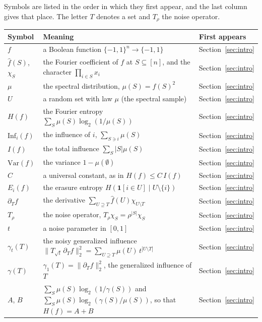 \documentclass[11pt]{amsart}
\theoremstyle{remark}
\newcommand{\Inf}{\mathrm{Inf}}
\newcommand{\Var}{\mathrm{Var}}
\begin{document}
Symbols are listed in the order in which they first appear, and the last column gives that place. The letter $T$
denotes a set and $T_\rho$ the noise operator.

\begin{longtable}{@{}>{\raggedright\arraybackslash}p{}>{\raggedright\arraybackslash}p{}>{\raggedright\arraybackslash}p{}@{}}
\toprule
Symbol & Meaning & First appears \\
\midrule
\endhead
$f$ & a Boolean function $\{-1,1\}^n\to\{-1,1\}$ & Section~\ref{sec:intro} \\
$\hat f(S)$, $\chi_S$ & the Fourier coefficient of $f$ at $S\subseteq[n]$, and the character $\prod_{i\in S}x_i$ & Section~\ref{sec:intro} \\
$\mu$ & the spectral distribution, $\mu(S)=\hat f(S)^2$ & Section~\ref{sec:intro} \\
$U$ & a random set with law $\mu$ (the spectral sample) & Section~\ref{sec:intro} \\
$H(f)$ & the Fourier entropy $\sum_S\mu(S)\log_2(1/\mu(S))$ & Section~\ref{sec:intro} \\
$\Inf_i(f)$ & the influence of $i$, $\sum_{S\ni i}\mu(S)$ & Section~\ref{sec:intro} \\
$I(f)$ & the total influence $\sum_S|S|\mu(S)$ & Section~\ref{sec:intro} \\
$\Var(f)$ & the variance $1-\mu(\emptyset)$ & Section~\ref{sec:intro} \\
$C$ & a universal constant, as in $H(f)\le C\,I(f)$ & Section~\ref{sec:intro} \\
$E_i(f)$ & the erasure entropy $H(\mathbf 1[i\in U]\mid U\setminus\{i\})$ & Section~\ref{sec:intro} \\
$\partial_Tf$ & the derivative $\sum_{U\supseteq T}\hat f(U)\chi_{U\setminus T}$ & Section~\ref{sec:intro} \\
$T_\rho$ & the noise operator, $T_\rho\chi_S=\rho^{|S|}\chi_S$ & Section~\ref{sec:intro} \\
$t$ & a noise parameter in $[0,1]$ & Section~\ref{sec:intro} \\
$\gamma_t(T)$ & the noisy generalized influence $\|T_{\sqrt t}\,\partial_Tf\|_2^2=\sum_{U\supseteq T}\mu(U)\,t^{|U\setminus T|}$ & Section~\ref{sec:intro} \\
$\gamma(T)$ & $\gamma_1(T)=\|\partial_Tf\|_2^2$, the generalized influence of $T$ & Section~\ref{sec:intro} \\
$A$, $B$ & $\sum_S\mu(S)\log_2(1/\gamma(S))$ and $\sum_S\mu(S)\log_2(\gamma(S)/\mu(S))$, so that $H(f)=A+B$ & Section~\ref{sec:intro} \\

\end{longtable}
\end{document}
